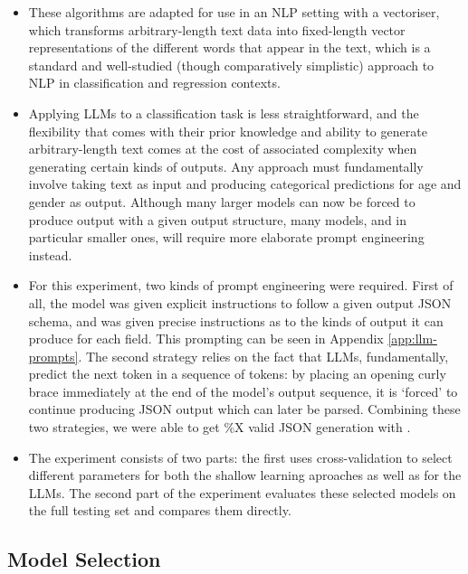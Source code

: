 \documentclass{report}
\begin{document}
\begin{itemize}

\item These algorithms are adapted for use in an NLP setting with a vectoriser, which transforms arbitrary-length text data into fixed-length vector representations of the different words that appear in the text, which is a standard and well-studied (though comparatively simplistic) approach to NLP in classification and regression contexts.

\item Applying LLMs to a classification task is less straightforward, and the flexibility that comes with their prior knowledge and ability to generate arbitrary-length text comes at the cost of associated complexity when generating certain kinds of outputs. Any approach must fundamentally involve taking text as input and producing categorical predictions for age and gender as output. Although many larger models can now be forced to produce output with a given output structure, many models, and in particular smaller ones, will require more elaborate prompt engineering  instead.

\item For this experiment, two kinds of prompt engineering were required. First of all, the model was given explicit instructions to follow a given output JSON schema, and was given precise instructions as to the kinds of output it can produce for each field. This prompting can be seen in Appendix \ref{app:llm-prompts}. The second strategy relies on the fact that LLMs, fundamentally, predict the next token in a sequence of tokens: by placing an opening curly brace immediately at the end of the model's output sequence, it is `forced' to continue producing JSON output which can later be parsed. Combining these two strategies, we were able to get  \%X valid JSON generation with .

\item The experiment consists of two parts: the first uses cross-validation to select different parameters for both the shallow learning aproaches as well as for the LLMs. The second part of the experiment evaluates these selected models on the full testing set and compares them directly.
\end{itemize}

\subsection{Model Selection}
\end{document}
